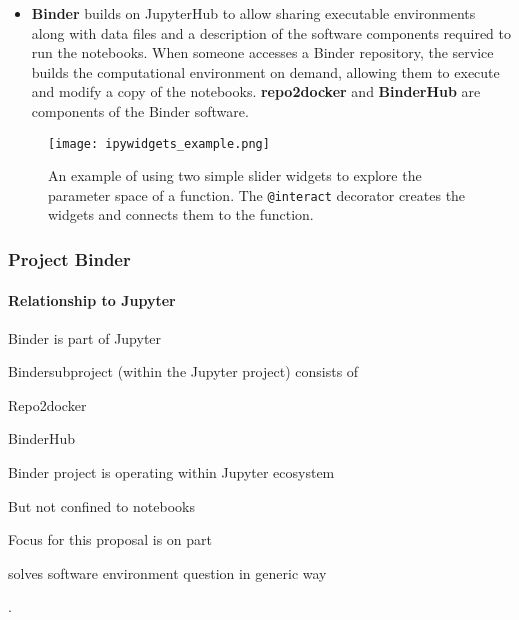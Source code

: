 \begin{itemize}
  \item \textbf{Binder} builds on JupyterHub to allow sharing executable
  environments along with data files and a description of the software components
  required to run the notebooks. When someone accesses a Binder repository,
  the service builds the computational environment on demand, allowing them to
  execute and modify a copy of the notebooks.
  \textbf{repo2docker} \cite{repo2docker} and \textbf{BinderHub} \cite{binder} are components of the Binder
  software. 
\end{itemize}

\begin{figure}[ht]\centering
  \texttt{[image: ipywidgets\_example.png]}
  \caption{An example of using two simple slider widgets to explore the
  parameter space of a function. The \texttt{@interact} decorator creates
  the widgets and connects them to the function.}
  \label{fig:ipywidgets-example}
\end{figure}


\subsubsection{Project Binder}\label{seq:project-binder}


\paragraph{Relationship to Jupyter}
\begin{compactitem}
\item Binder is part of Jupyter
\item Bindersubproject (within the Jupyter project) consists of
\begin{compactitem}
\item Repo2docker
\item BinderHub
\end{compactitem}
\item Binder project is operating within Jupyter ecosystem
\item But not confined to notebooks
\item Focus for this proposal is on \repotodocker{} part
\item \repotodocker{} solves software environment question in generic way
\end{compactitem}
.

